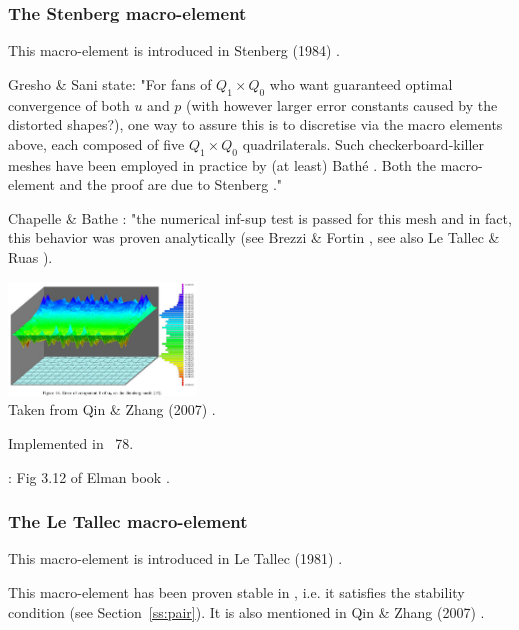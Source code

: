 
\subsubsection{The Stenberg macro-element} 

This macro-element is introduced in Stenberg (1984) \cite{sten84}. 



Gresho \& Sani \cite{grsa} state: "For fans of $Q_1\times Q_0$ who want 
guaranteed optimal convergence of both $u$ and $p$ (with however larger error 
constants caused by the distorted shapes?), one way to assure this is
to discretise via the macro elements above, each composed of five $Q_1\times Q_0$
quadrilaterals. Such checkerboard-killer meshes have been employed in practice
by (at least) Bath\'e \cite{chba93}. Both the macro-element and the proof are
due to Stenberg \cite{sten84}."

Chapelle \& Bathe \cite{chba93}: "the numerical inf-sup test is passed for this mesh and in fact,
this behavior was proven analytically (see Brezzi \& Fortin \cite{brfo}, see 
also Le Tallec \& Ruas \cite{leru86}).

\begin{center}
\includegraphics[width=5cm]{images/meshtopos/qizh07}\\
{\captionfont Taken from Qin \& Zhang (2007) \cite{qizh07}.}
\end{center}

Implemented in \stone~78.

\Literature: Fig 3.12 of Elman \etal book \cite{elsw}.

\subsubsection{The Le Tallec macro-element} 

This macro-element is introduced in Le Tallec (1981) \cite{leta81}.



This macro-element has been proven stable in \cite{leta81,leru86}, i.e. it satisfies 
the stability condition (see Section~\ref{ss:pair}).
It is also mentioned in Qin \& Zhang (2007) \cite{qizh07}.

